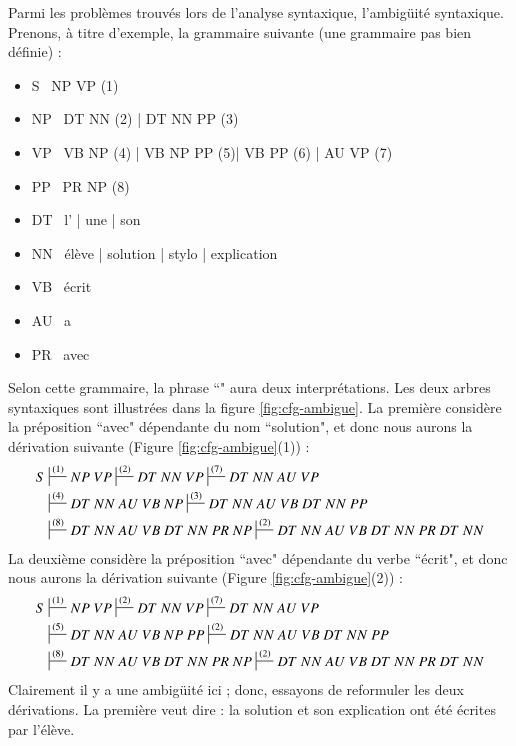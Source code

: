 \documentclass{KodeBook}
\begin{document}
Parmi les problèmes trouvés lors de l'analyse syntaxique, l'ambigüité syntaxique.
Prenons, à titre d'exemple, la grammaire suivante (une grammaire pas bien définie) : 
\begin{itemize}
	\item S \textrightarrow\ NP VP (1)
	\item NP \textrightarrow\ DT NN (2) | DT NN PP (3)
	\item VP \textrightarrow\ VB NP (4) | VB NP PP (5)| VB PP (6) | AU VP (7)
	\item PP \textrightarrow\ PR NP (8)
	\item DT \textrightarrow\ l' | une | son 
	\item NN \textrightarrow\ élève | solution | stylo | explication 
	\item VB \textrightarrow\ écrit 
	\item AU \textrightarrow\ a
	\item PR \textrightarrow\ avec
\end{itemize}
Selon cette grammaire, la phrase ``" aura deux interprétations. 
Les deux arbres syntaxiques sont illustrées dans la figure \ref{fig:cfg-ambigue}.
La première considère la préposition ``avec" dépendante du nom ``solution", et donc nous aurons la dérivation suivante (Figure \ref{fig:cfg-ambigue}(1)) : 
\begin{align*}
S & \sststile{}{(1)} NP\ VP \sststile{}{(2)} DT\ NN\ VP \sststile{}{(7)} DT\ NN\ AU\ VP \\
  & \sststile{}{(4)} DT\ NN\ AU\ VB\ NP \sststile{}{(3)} DT\ NN\ AU\ VB\ DT\ NN\ PP \\
  & \sststile{}{(8)} DT\ NN\ AU\ VB\ DT\ NN\ PR\ NP 
   \sststile{}{(2)} DT\ NN\ AU\ VB\ DT\ NN\ PR\ DT\ NN 
\end{align*}
La deuxième considère la préposition ``avec" dépendante du verbe ``écrit", et donc nous aurons la dérivation suivante (Figure \ref{fig:cfg-ambigue}(2)) :
\begin{align*}
S & \sststile{}{(1)} NP\ VP \sststile{}{(2)} DT\ NN\ VP \sststile{}{(7)} DT\ NN\ AU\ VP \\
& \sststile{}{(5)} DT\ NN\ AU\ VB\ NP\ PP \sststile{}{(2)} DT\ NN\ AU\ VB\ DT\ NN\ PP \\
& \sststile{}{(8)} DT\ NN\ AU\ VB\ DT\ NN\ PR\ NP 
 \sststile{}{(2)} DT\ NN\ AU\ VB\ DT\ NN\ PR\ DT\ NN 
\end{align*}
Clairement il y a une ambigüité ici ; donc, essayons de reformuler les deux dérivations.
La première veut dire : la solution et son explication ont été écrites par l'élève. 
\end{document}
